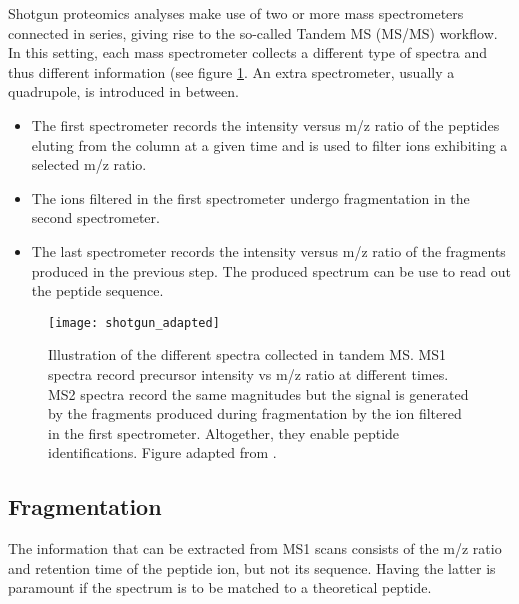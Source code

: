 
Shotgun proteomics analyses make use of two or more mass spectrometers connected in series, giving rise to the so-called Tandem MS (\ac{MS/MS}) workflow. In this setting, each mass spectrometer collects a different type of spectra and thus different information (see figure \ref{fig:shotgun}. An extra spectrometer, usually a quadrupole, is introduced in between.

\begin{itemize}

\item The first spectrometer records the intensity versus \ac{m/z} ratio of the peptides eluting from the column at a given time and is used to filter ions exhibiting a selected \ac{m/z} ratio.

\item The ions filtered in the first spectrometer undergo fragmentation in the second spectrometer. %

\item The last spectrometer records the intensity versus \ac{m/z} ratio of the fragments produced in the previous step. The produced spectrum can be use to read out the peptide sequence.

\end{itemize}

\begin{figure}[!h]
\centering
\texttt{[image: shotgun\_adapted]}
\caption{Illustration of the different spectra collected in tandem MS. MS1 spectra record precursor intensity vs \ac{m/z} ratio at different times. MS2 spectra record the same magnitudes but the signal is generated by the fragments produced during fragmentation by the ion filtered in the first spectrometer. Altogether, they enable peptide identifications. Figure adapted from \cite{Verheggen2017}.}
\label{fig:shotgun}
\end{figure}

\subsection{Fragmentation}
\label{subsec:fragmentation}

The information that can be extracted from \ac{MS1} scans consists of the \ac{m/z} ratio and retention time of the peptide ion, but not its sequence. Having the latter is paramount if the spectrum is to be matched to a theoretical peptide.


